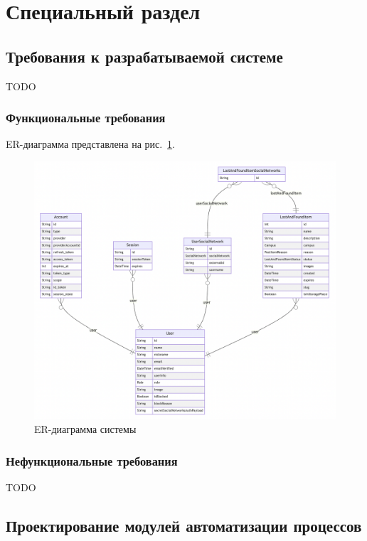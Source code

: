 \documentclass{mirea}
\begin{document}
\section{Специальный раздел}

\subsection{Требования к разрабатываемой системе}

TODO

\subsubsection{Функциональные требования}

ER-диаграмма представлена на рис.~\ref{fig:erd}.

\begin{figure}[htb]
	\centering
	\includegraphics[width=.95\textwidth]{images/erd}
	\parskip=6pt
	\caption{ER-диаграмма системы}
	\label{fig:erd}
\end{figure}

\subsubsection{Нефункциональные требования}

TODO

\subsection{Проектирование модулей автоматизации процессов}
\end{document}

